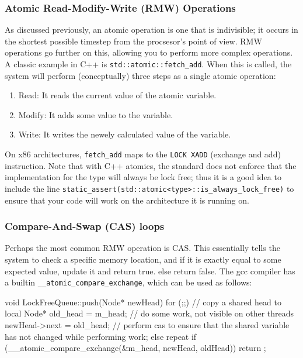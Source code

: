 \documentclass[11pt, a4paper]{article}
\theoremstyle{definition}
\theoremstyle{remark}
\begin{document}
\subsubsection{Atomic Read-Modify-Write (RMW) Operations}
As discussed previously, an atomic operation is one that is indivisible; it occurs in the shortest possible timestep from the procsesor's point of view. 
RMW operations go further on this, allowing you to perform more complex operations. A classic example in C++ is 
\lstinline|std::atomic::fetch_add|. When this is called, the system will perform (conceptually) three steps as a single atomic operation:
\begin{enumerate}
\item Read: It reads the current value of the atomic variable.
\item Modify: It adds some value to the variable.
\item Write: It writes the newely calculated value of the variable.
\end{enumerate}
On x86 architectures, \lstinline|fetch_add| maps to the \lstinline|LOCK XADD| (exchange and add) instruction. Note that with C++ atomics, the standard does not enforce that the implementation for the type will always be lock free; thus 
it is a good idea to include the line \lstinline|static_assert(std::atomic<type>::is_always_lock_free)| to ensure that your code will work on the architecture it is running on.
\subsubsection{Compare-And-Swap (CAS) loops}
Perhaps the most common RMW operation is CAS. This essentially tells the system to check a specific memory location, and if it is exactly equal to some expected value, update it and return true. else return false. The gcc compiler has a builtin
\lstinline|__atomic_compare_exchange|, which can be used as follows:
\newpage
\begin{ccode}
void LockFreeQueue::push(Node* newHead) {
  for (;;) {
    // copy a shared head to local
    Node* old_head = m_head;
    // do some work, not visible on other threads
    newHead->next = old_head;
    // perform cas to ensure that the shared variable has not changed while performing work; else repeat
    if (__atomic_compare_exchange(&m_head, newHead, oldHead)) return ;
  }
}
\end{ccode}
\end{document}
